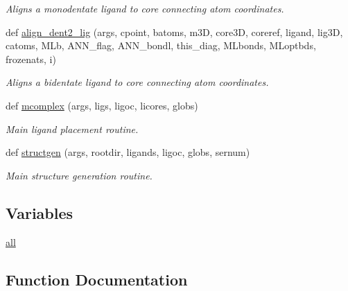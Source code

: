 \begin{DoxyCompactItemize}
\begin{DoxyCompactList}\small\item\em Aligns a monodentate ligand to core connecting atom coordinates. \end{DoxyCompactList}\item 
def \hyperlink{namespacemolSimplify_1_1Scripts_1_1structgen_a458be04ee9ec1f9d32c81b5b7448fcec}{align\+\_\+dent2\+\_\+lig} (args, cpoint, batoms, m3D, core3D, coreref, ligand, lig3D, catoms, M\+Lb, A\+N\+N\+\_\+flag, A\+N\+N\+\_\+bondl, this\+\_\+diag, M\+Lbonds, M\+Loptbds, frozenats, i)
\begin{DoxyCompactList}\small\item\em Aligns a bidentate ligand to core connecting atom coordinates. \end{DoxyCompactList}\item 
def \hyperlink{namespacemolSimplify_1_1Scripts_1_1structgen_a343f959db73f414f9f717d2a7f2ab18c}{mcomplex} (args, ligs, ligoc, licores, globs)
\begin{DoxyCompactList}\small\item\em Main ligand placement routine. \end{DoxyCompactList}\item 
def \hyperlink{namespacemolSimplify_1_1Scripts_1_1structgen_a88cde12602c0445fff9fe6921415aad4}{structgen} (args, rootdir, ligands, ligoc, globs, sernum)
\begin{DoxyCompactList}\small\item\em Main structure generation routine. \end{DoxyCompactList}\end{DoxyCompactItemize}
\subsection*{Variables}
\begin{DoxyCompactItemize}
\item 
\hyperlink{namespacemolSimplify_1_1Scripts_1_1structgen_a2ef014c1f2b0eae8ccc7784c704bdfd9}{all}
\end{DoxyCompactItemize}


\subsection{Function Documentation}
\mbox{\label{namespacemolSimplify_1_1Scripts_1_1structgen_a91f6c3dc244887d2e71cdfa122ee7993}} 
